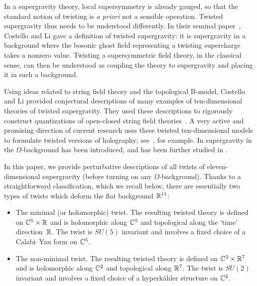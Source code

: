 In a supergravity theory, local supersymmetry is already gauged, so that the standard notion of twisting is {\em a priori} not a sensible operation. Twisted supergravity thus needs to be  understood differently.
In their seminal paper~\cite{CLsugra}, Costello and Li gave a definition of twisted supergravity: it is supergravity in a background where the bosonic ghost field representing a twisting supercharge takes a nonzero value.
Twisting a supersymmetric field theory, in the classical sense, can then be  understood as coupling the theory to supergravity and placing it in such a background.

Using ideas related to string field theory and the topological B-model, Costello and Li provided conjectural descriptions of many examples of ten-dimensional theories of twisted supergravity. They used these descriptions to rigorously construct quantizations of open-closed string field theories~\cite{CLbcov1,CLtypeI}. 
A very active and promising direction of current research uses these twisted ten-dimensional models to formulate twisted versions of holography; see~\cite{CostelloM2, Costello_2021, costello2021twisted, Ishtiaque_2020, budzik2021giant, Gaiotto:2020vqj}, for example.
In \cite{CostelloM5} supergravity in the $\Omega$-background has been introduced, and has been further studied in \cite{Gaiotto:2019wcc, Oh:2020hph, Oh:2021bwi}. 

In this paper, we provide perturbative descriptions of all twists of eleven-dimensional supergravity (before turning on any $\Omega$-background).
Thanks to a straightforward classification, which we recall below, there are essentially two types of twists which deform the flat background $\mathbb R^{11}$: 
\begin{itemize}[leftmargin=\parindent,itemsep=\parskip]
\item The minimal (or holomorphic) twist. 
The resulting twisted theory is defined on $\mathbb C^5 \times \mathbb R$ and is holomorphic along $\mathbb C^5$ and topological along the `time' direction~$\mathbb R$. 
The twist is $SU(5)$ invariant and involves a fixed choice of a Calabi--Yau form on $\mathbb C^5$. 
\item The non-minimal twist. 
The resulting twisted theory is defined on $\mathbb C^2 \times \mathbb R^7$ and is holomorphic along $\mathbb C^2$ and topological along $\mathbb R^7$.
The twist is $SU(2)$ invariant and involves a fixed choice of a hyperk\"ahler structure on $\mathbb C^2$.  
\end{itemize}

